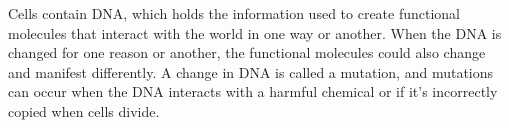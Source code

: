 \documentclass{article}
\begin{document}
\linenumbers


Cells contain DNA, which holds the information used to create functional molecules that interact with the world in one way or another.
When the DNA is changed for one reason or another, the functional molecules could also change and manifest differently.
A change in DNA is called a mutation, and mutations can occur when the DNA interacts with a harmful chemical or if it's incorrectly copied when cells divide.
\end{document}

